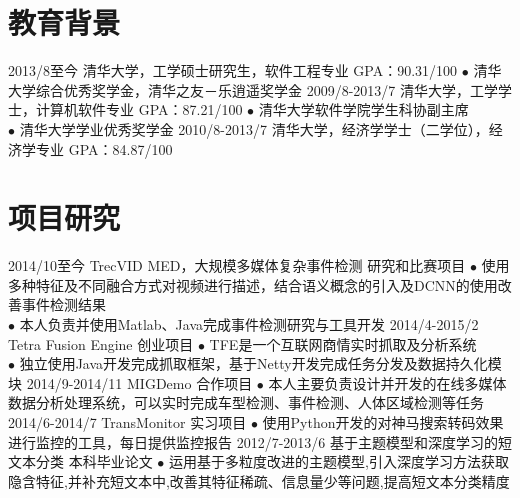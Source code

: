 \documentclass[]{friggeri-cv-cn}
\begin{document}


\section{教育背景}

\begin{entrylist}
  \entry
    {2013/8至今}
    {清华大学，工学硕士研究生，软件工程专业}
    {GPA：90.31/100}
    {
    $\bullet$ 清华大学综合优秀奖学金，清华之友－乐逍遥奖学金
    }
  \entry
    {2009/8-2013/7}
    {清华大学，工学学士，计算机软件专业}
    {GPA：87.21/100}
    {
    $\bullet$ 清华大学软件学院学生科协副主席\\
    $\bullet$ 清华大学学业优秀奖学金
    }
  \entry
    {2010/8-2013/7}
    {清华大学，经济学学士（二学位），经济学专业}
    {GPA：84.87/100}
    {}
\end{entrylist}

\section{项目研究}

\begin{entrylist}
  \entry
    {2014/10至今}
    {TrecVID MED，大规模多媒体复杂事件检测}
    {研究和比赛项目}
    {$\bullet$ 使用多种特征及不同融合方式对视频进行描述，结合语义概念的引入及DCNN的使用改善事件检测结果\\
    $\bullet$ 本人负责并使用Matlab、Java完成事件检测研究与工具开发}
  \entry
    {2014/4-2015/2}
    {Tetra Fusion Engine}
    {创业项目}
    {$\bullet$ TFE是一个互联网商情实时抓取及分析系统\\
    $\bullet$ 独立使用Java开发完成抓取框架，基于Netty开发完成任务分发及数据持久化模块}
  \entry
    {2014/9-2014/11}
    {MIGDemo}
    {合作项目}
    {$\bullet$ 本人主要负责设计并开发的在线多媒体数据分析处理系统，可以实时完成车型检测、事件检测、人体区域检测等任务}
  \entry
    {2014/6-2014/7}
    {TransMonitor}
    {实习项目}
    {$\bullet$ 使用Python开发的对神马搜索转码效果进行监控的工具，每日提供监控报告}
  \entry
    {2012/7-2013/6}
    {基于主题模型和深度学习的短文本分类}
    {本科毕业论文}
    {$\bullet$ 运用基于多粒度改进的主题模型,引入深度学习方法获取隐含特征,并补充短文本中,改善其特征稀疏、信息量少等问题,提高短文本分类精度}
\end{entrylist}
\end{document}
